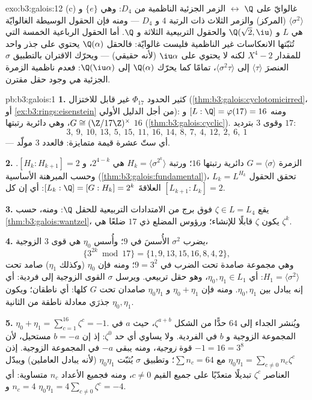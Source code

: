 \begin{solution}{exo:b3:galois:12}
(c) غالوايّ على $\Q$ $\leftrightarrow$ الزمر الجزئية الناظمية من $D_4$:
وهي $\{e\}$ و $\langle\sigma^2\rangle$ (المركز) والزمر الثلاث ذات الرتبة $4$
و $D_4$ --- ومنه فإن الحقول الوسيطة الغالوايّة هي $L$ و $\Q(\sqrt2, \iu)$
والحقول التربيعية الثلاثة و $\Q$. أما الحقول الرباعية الخمسة
التي تُثبّتها الانعكاسات غير الناظمية فليست غالوايّة:
فالحقل $\Q(\alpha)$ يحتوي على جذر واحد للمقدار $X^4 - 2$ لكنه لا يحتوي على
$\iu\alpha$ (لأنه حقيقي) --- ويحرّك الاقتران بالتطبيق $\sigma$ العنصرَ
$\langle\tau\rangle$ إلى $\langle\sigma^2\tau\rangle$، تمامًا كما يحرّك $\Q(\alpha)$ إلى
$\Q(\iu\alpha)$: فعدم ناظمية الزمرة الجزئية \emph{هي} وجود حقل
مقترن.
\end{solution}

\begin{solution}{pb:b3:galois:1}
\textbf{1.} كثير الحدود $\Phi_{17}$ غير قابل للاختزال
(\cref{thm:b3:galois:cyclotomicirred}، أو \cref{ex:b3:rings:eisenstein} من أجل الدليل الأولي): ومنه $[L:\Q] =
\varphi(17) = 16$
و $G \cong (\Z/17\Z)^\times$، وهي دائرية رتبتها $16$ (\cref{thm:b3:galois:cyclic}). وقوى $3$ بترديد
$17$:
\[
3,\ 9,\ 10,\ 13,\ 5,\ 15,\ 11,\ 16,\ 14,\ 8,\ 7,\ 4,\ 12,\ 2,\
6,\ 1
\]
--- أي ستّ عشرة قيمة متمايزة: فالعدد $3$ مولّد.

\textbf{2.} الزمرة $G = \langle\sigma\rangle$ دائرية رتبتها $16$؛ ورتبة $H_k = \langle\sigma^{2^k}\rangle$
هي $2^{4-k}$، و $[H_k : H_{k+1}] = 2$. وحسب المبرهنة الأساسية (\cref{thm:b3:galois:fundamental})،
تحقق الحقول $L_k = L^{H_k}$ العلاقةَ $[L_k : \Q] = [G : H_k] = 2^k$: أي إن كل $[L_{k+1}:L_k] = 2$.

\textbf{3.} يقع $\zeta \in L = L_4$ فوق برج من الامتدادات التربيعية للحقل
$\Q$: ومنه، حسب \cref{thm:b3:galois:wantzel}، يكون $\zeta$ قابلًا للإنشاء؛
ورؤوس المضلع ذي $17$ ضلعًا هي $\zeta^k$.

\textbf{4.} يضرب $\sigma^2$ الأُسسَ في $9$؛ وأُسس $\eta_0$ هي
قوى $3$ الزوجية،
\[
\{3^{2k} \bmod 17\} = \{1, 9, 13, 15, 16, 8, 4, 2\},
\]
وهي مجموعة صامدة تحت الضرب في $9 = 3^2$؛ ومنه فإن $\eta_0$
(وكذلك $\eta_1$) صامد تحت $H_1 =
\langle\sigma^2\rangle$: أي $\eta_0, \eta_1 \in L_1$، وهو حقل تربيعي.
ويرسل $\sigma$ القوى الزوجية إلى فردية: أي إنه يبادل بين $\eta_0,
\eta_1$.
ومنه فإن $\eta_0 + \eta_1$ و $\eta_0\eta_1$ صامدان تحت $G$ كلها: أي
ناطقان؛ ويكون $\eta_0, \eta_1$ جذرَي معادلة ناطقة من 
الثانية.

\textbf{5.} $\eta_0 + \eta_1 = \sum_{c=1}^{16}\zeta^c = -1$. ويُنشر الجداء إلى $64$ حدًّا من الشكل
$\zeta^{a + b}$، حيث $a$ في المجموعة الزوجية و $b$ في الفردية.
ولا يساوي أي حد $\zeta^0$: إذ إن $b = -a$ مستحيل، لأن
$-1 = 16 = 3^8$ قوة \emph{زوجية}، ومنه يبقى $-a$ في المجموعة
الزوجية. إذن $\eta_0\eta_1 = \sum_{c \neq 0}
n_c\zeta^c$ مع $\sum n_c = 64$؛ وتطبيق $\sigma$ يُثبّت
$\eta_0\eta_1$ (لأنه يبادل العاملين) ويبدّل العناصر $\zeta^c$
تبديلًا متعدّيًا على جميع القيم $c \neq 0$، ومنه فجميع الأعداد
$n_c$ متساوية: أي $n_c
= 4$ و $\eta_0\eta_1 = 4\sum_{c\neq0}\zeta^c = -4$.


\end{solution}
